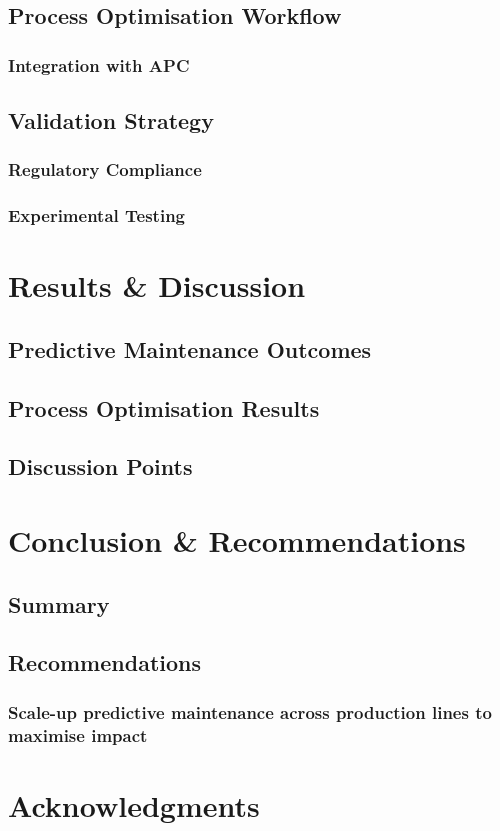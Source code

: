 \documentclass[fleqn,10pt]{olplainarticle}
\begin{document}
\subsection{Process Optimisation Workflow}
\subsubsection{Integration with APC}
\subsection{Validation Strategy}
\subsubsection{Regulatory Compliance}
\subsubsection{Experimental Testing}
\section{Results \& Discussion}
\subsection{Predictive Maintenance Outcomes}
\subsection{Process Optimisation Results}
\subsection{Discussion Points}
\section{Conclusion \& Recommendations}
\subsection{Summary}
\subsection{Recommendations}
\subsubsection{Scale-up predictive maintenance across production lines to maximise impact}

\section*{Acknowledgments}



\end{document}
